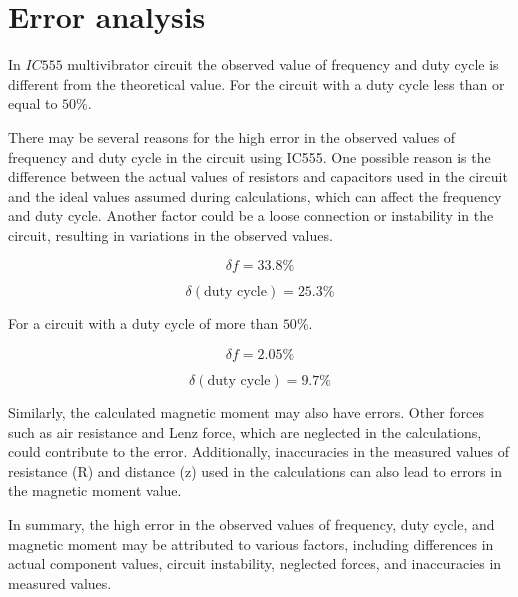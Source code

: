 \section{Error analysis}
	In $IC 555$ multivibrator circuit the observed value of frequency and duty cycle is different from the theoretical value. For the circuit with a duty cycle less than or equal to $50\%$.

	There may be several reasons for the high error in the observed values of frequency and duty cycle in the circuit using IC555. One possible reason is the difference between the actual values of resistors and capacitors used in the circuit and the ideal values assumed during calculations, which can affect the frequency and duty cycle. Another factor could be a loose connection or instability in the circuit, resulting in variations in the observed values.

	$$\delta f=33.8\%$$

	$$\delta (\text{duty cycle}) = 25.3\%$$

	For a circuit with a duty cycle of more than $50\%$.

	$$\delta f=2.05\%$$

	$$\delta (\text{duty cycle}) = 9.7\%$$

	Similarly, the calculated magnetic moment may also have errors. Other forces such as air resistance and Lenz force, which are neglected in the calculations, could contribute to the error. Additionally, inaccuracies in the measured values of resistance (R) and distance (z) used in the calculations can also lead to errors in the magnetic moment value.
	
	In summary, the high error in the observed values of frequency, duty cycle, and magnetic moment may be attributed to various factors, including differences in actual component values, circuit instability, neglected forces, and inaccuracies in measured values.